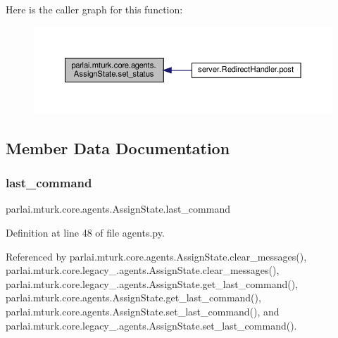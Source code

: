 Here is the caller graph for this function\+:
\nopagebreak
\begin{figure}[H]
\begin{center}
\leavevmode
\includegraphics[width=350pt]{classparlai_1_1mturk_1_1core_1_1agents_1_1AssignState_a7cd23ff37c1c1e0c6d8548f77a8d078c_icgraph}
\end{center}
\end{figure}


\subsection{Member Data Documentation}
\mbox{\label{classparlai_1_1mturk_1_1core_1_1agents_1_1AssignState_a055a267b03cf1ad3aed703ca83b52597}} 
\subsubsection{\texorpdfstring{last\+\_\+command}{last\_command}}
{\footnotesize\ttfamily parlai.\+mturk.\+core.\+agents.\+Assign\+State.\+last\+\_\+command}



Definition at line 48 of file agents.\+py.



Referenced by parlai.\+mturk.\+core.\+agents.\+Assign\+State.\+clear\+\_\+messages(), parlai.\+mturk.\+core.\+legacy\+\_.\+agents.\+Assign\+State.\+clear\+\_\+messages(), parlai.\+mturk.\+core.\+legacy\+\_.\+agents.\+Assign\+State.\+get\+\_\+last\+\_\+command(), parlai.\+mturk.\+core.\+agents.\+Assign\+State.\+get\+\_\+last\+\_\+command(), parlai.\+mturk.\+core.\+agents.\+Assign\+State.\+set\+\_\+last\+\_\+command(), and parlai.\+mturk.\+core.\+legacy\+\_.\+agents.\+Assign\+State.\+set\+\_\+last\+\_\+command().

